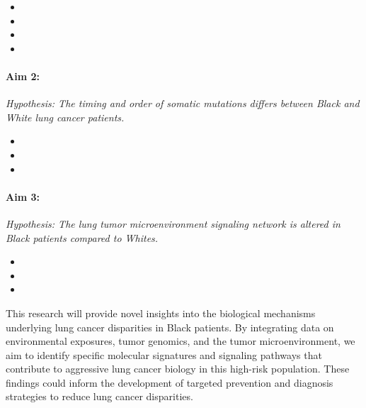 \begin{itemize}[noitemsep]
	\item \SpecificAimOneA
	\item \SpecificAimOneB
	\item \SpecificAimOneC
	\item \SpecificAimOneD
\end{itemize}

\paragraph*{Aim 2: \SpecificAimTwo} \emph{Hypothesis: The timing and order of somatic mutations differs between Black and White lung cancer patients.}

\begin{itemize}[noitemsep]
	\item \SpecificAimTwoA
	\item \SpecificAimTwoB
	\item \SpecificAimTwoC
\end{itemize}

\paragraph*{Aim 3: \SpecificAimThree} \emph{Hypothesis: The lung tumor microenvironment signaling network is altered in Black patients compared to Whites.}

\begin{itemize}[noitemsep]
	\item \SpecificAimThreeA
	\item \SpecificAimThreeB
	\item \SpecificAimThreeC
\end{itemize}

This research will provide novel insights into the biological mechanisms underlying lung cancer disparities in Black patients. 
By integrating data on environmental exposures, tumor genomics, and the tumor microenvironment, 
we aim to identify specific molecular signatures and signaling pathways that contribute to aggressive lung cancer biology in this high-risk population. 
These findings could inform the development of targeted prevention and diagnosis strategies to reduce lung cancer disparities.



